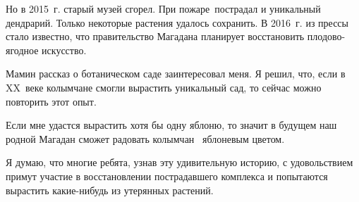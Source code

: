 Но в 2015~г. старый музей сгорел. При пожаре пострадал и уникальный дендрарий. Только некоторые растения удалось сохранить.
В 2016~г. из прессы стало известно, что правительство Магадана планирует восстановить плодово-ягодное искусство.

Мамин рассказ о ботаническом саде заинтересовал меня. Я решил, что, если в XX~веке колымчане смогли вырастить уникальный сад, то сейчас можно повторить этот опыт.

Если мне удастся вырастить хотя бы одну яблоню, то значит в будущем наш родной Магадан сможет радовать колымчан  яблоневым цветом.

Я думаю, что многие ребята, узнав эту удивительную историю, с удовольствием примут участие в восстановлении пострадавшего комплекса и попытаются вырастить какие-нибудь из утерянных растений.
